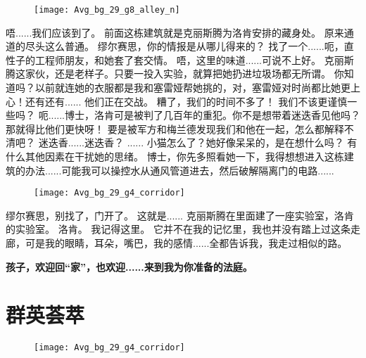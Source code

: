 \documentclass[openany]{book}
\begin{document}
\begin{figure}[h]
    \centering
    \texttt{[image: Avg\_bg\_29\_g8\_alley\_n]}
\end{figure}
\begin{dialogue}
     唔......我们应该到了。
     前面这栋建筑就是克丽斯腾为洛肯安排的藏身处。
     原来通道的尽头这么普通。
     缪尔赛思，你的情报是从哪儿得来的？
     找了一个......呃，直性子的工程师朋友，和她套了套交情。
     唔，这里的味道......可说不上好。
     克丽斯腾这家伙，还是老样子。只要一投入实验，就算把她扔进垃圾场都无所谓。
     你知道吗？以前就连她的衣服都是我和塞雷娅帮她挑的，对，塞雷娅对时尚都比她更上心！还有还有......
     他们正在交战。
     糟了，我们的时间不多了！
     我们不该更谨慎一些吗？
     呃......博士，洛肯可是被判了几百年的重犯。你不是想带着迷迭香见他吗？那就得比他们更快呀！
     要是被军方和梅兰德发现我们和他在一起，怎么都解释不清吧？
     迷迭香......迷迭香？
     ......
     小猫怎么了？她好像呆呆的，是在想什么吗？
     有什么其他因素在干扰她的思绪。
     博士，你先多照看她一下，我得想想进入这栋建筑的办法......可能我可以操控水从通风管道进去，然后破解隔离门的电路......
    \begin{figure}[h]
        \centering
        \texttt{[image: Avg\_bg\_29\_g4\_corridor]}
    \end{figure}
     缪尔赛思，别找了，门开了。
     这就是......
     克丽斯腾在里面建了一座实验室，洛肯的实验室。
     洛肯。
     我记得这里。
     它并不在我的记忆里，我也并没有踏上过这条走廊，可是我的眼睛，耳朵，嘴巴，我的感情......全都告诉我，我走过相似的路。
\end{dialogue}
\begin{center} \textbf{孩子，欢迎回“家”，也欢迎......来到我为你准备的法庭。}\end{center}

\chapter{群英荟萃}

\begin{figure}[h]
    \centering
    \texttt{[image: Avg\_bg\_29\_g4\_corridor]}
\end{figure}
\end{document}
